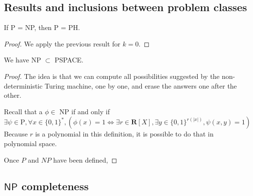 \subsection{Results and inclusions between problem classes}

\begin{corollary}
    If P = NP, then P = PH.
\end{corollary}

\begin{proof}
    We apply the previous result for $ k = 0 $.
\end{proof}

\begin{proposition}
    We have NP $ \subset $ PSPACE.
\end{proposition}

\begin{proof}
    The idea is that we can compute all possibilities suggested by the non-deterministic Turing machine, one by one, and erase the answers one after the other.

    Recall that a $ \phi \in $ NP if and only if
    \[
        \exists \psi \in \mathrm P, \forall x \in \{ 0,1 \}^*, ( \phi(x) = 1 \iff \exists r \in \mathbf R[X], \exists y \in \{ 0,1 \}^{r(|x|)}, \psi(x,y) = 1)
    \]
    Because $ r $ is a polynomial in this definition, it is possible to do that in polynomial space.


Once $P$ and $NP$ have been defined,
\end{proof}

\subsection{$ \mathsf{NP} $ completeness}

\begin{definition}

\end{definition}


\subsubsection{}
